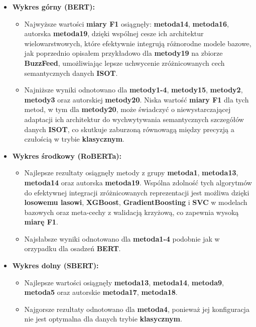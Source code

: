 \begin{itemize}
	\item \textbf{Wykres górny (BERT):}
	      \begin{itemize}
		      \item Najwyższe wartości \textbf{miary F1} osiągnęły: \textbf{metoda14}, \textbf{metoda16}, autorska \textbf{metoda19}, dzięki wspólnej cesze ich architektur wielowarstwowych, które efektywnie integrują różnorodne modele bazowe, jak poprzednio opisałem przykładowo dla \textbf{metody19} na zbiorze \textbf{BuzzFeed}, umożliwiając lepsze uchwycenie zróżnicowanych cech semantycznych danych \textbf{ISOT}.
		      \item Najniższe wyniki odnotowano dla \textbf{metody1-4}, \textbf{metody15}, \textbf{metody2}, \textbf{metody3} oraz autorskiej \textbf{metody20}. Niska wartość \textbf{miary F1} dla tych metod, w tym dla \textbf{metody20}, może świadczyć o niewystarczającej adaptacji ich architektur do wychwytywania semantycznych szczegółów danych \textbf{ISOT}, co skutkuje zaburzoną równowagą między precyzją a czułością w trybie \textbf{klasycznym}.
	      \end{itemize}

	\item \textbf{Wykres środkowy (RoBERTa):}
	      \begin{itemize}
		      \item Najlepsze rezultaty osiągnęły metody z grupy \textbf{metoda1}, \textbf{metoda13}, \textbf{metoda14} oraz autorska \textbf{metoda19}. Wspólna zdolność tych algorytmów do efektywnej integracji zróżnicowanych reprezentacji jest możliwa dzięki \textbf{losowemu lasowi}, \textbf{XGBoost}, \textbf{GradientBoosting} i \textbf{SVC} w modelach bazowych oraz meta-cechy z walidacją krzyżową, co zapewnia wysoką \textbf{miarę F1}.
		      \item Najsłabsze wyniki odnotowano dla \textbf{metoda1-4} podobnie jak w orzypadku dla osadzeń \textbf{BERT}.
	      \end{itemize}

	\item \textbf{Wykres dolny (SBERT):}
	      \begin{itemize}
		      \item Najlepsze wartości osiągnęły \textbf{metoda13}, \textbf{metoda14}, \textbf{metoda9}, \textbf{metoda5} oraz autorskie \textbf{metoda17}, \textbf{metoda18}.
		      \item Najgorsze rezultaty odnotowano dla \textbf{metoda4}, ponieważ jej konfiguracja nie jest optymalna dla danych trybie \textbf{klasycznym}.
	      \end{itemize}
\end{itemize}


